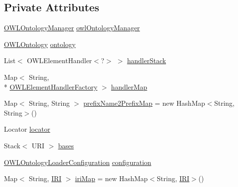 \subsection*{Private Attributes}
\begin{DoxyCompactItemize}
\item 
\hyperlink{interfaceorg_1_1semanticweb_1_1owlapi_1_1model_1_1_o_w_l_ontology_manager}{O\-W\-L\-Ontology\-Manager} \hyperlink{classorg_1_1coode_1_1owlapi_1_1owlxmlparser_1_1_o_w_l_x_m_l_parser_handler_a51c72f046db052e3704e4049b47f9c14}{owl\-Ontology\-Manager}
\item 
\hyperlink{interfaceorg_1_1semanticweb_1_1owlapi_1_1model_1_1_o_w_l_ontology}{O\-W\-L\-Ontology} \hyperlink{classorg_1_1coode_1_1owlapi_1_1owlxmlparser_1_1_o_w_l_x_m_l_parser_handler_a6d5ccb6789681f41e359aa9ac02babde}{ontology}
\item 
List$<$ O\-W\-L\-Element\-Handler$<$?$>$ $>$ \hyperlink{classorg_1_1coode_1_1owlapi_1_1owlxmlparser_1_1_o_w_l_x_m_l_parser_handler_a9c14591dd78f738abd2b47f7ebcf199d}{handler\-Stack}
\item 
Map$<$ String, \\*
\hyperlink{interfaceorg_1_1coode_1_1owlapi_1_1owlxmlparser_1_1_o_w_l_element_handler_factory}{O\-W\-L\-Element\-Handler\-Factory} $>$ \hyperlink{classorg_1_1coode_1_1owlapi_1_1owlxmlparser_1_1_o_w_l_x_m_l_parser_handler_a55c04cbf4b72c3dff117fabb010720a8}{handler\-Map}
\item 
Map$<$ String, String $>$ \hyperlink{classorg_1_1coode_1_1owlapi_1_1owlxmlparser_1_1_o_w_l_x_m_l_parser_handler_a3c632c754655fdcf3a3321244805d47e}{prefix\-Name2\-Prefix\-Map} = new Hash\-Map$<$String, String$>$()
\item 
Locator \hyperlink{classorg_1_1coode_1_1owlapi_1_1owlxmlparser_1_1_o_w_l_x_m_l_parser_handler_aba5b14a8a3f5be6534e0f65b2e680574}{locator}
\item 
Stack$<$ U\-R\-I $>$ \hyperlink{classorg_1_1coode_1_1owlapi_1_1owlxmlparser_1_1_o_w_l_x_m_l_parser_handler_a90db7d12c0d5cfe114dbd76147cc0f0e}{bases}
\item 
\hyperlink{classorg_1_1semanticweb_1_1owlapi_1_1model_1_1_o_w_l_ontology_loader_configuration}{O\-W\-L\-Ontology\-Loader\-Configuration} \hyperlink{classorg_1_1coode_1_1owlapi_1_1owlxmlparser_1_1_o_w_l_x_m_l_parser_handler_a1bcc0a7d0e8c701ef8b9cc56afe0f12c}{configuration}
\item 
Map$<$ String, \hyperlink{classorg_1_1semanticweb_1_1owlapi_1_1model_1_1_i_r_i}{I\-R\-I} $>$ \hyperlink{classorg_1_1coode_1_1owlapi_1_1owlxmlparser_1_1_o_w_l_x_m_l_parser_handler_ad14daaba62dd59bdbee7b6a0a92aeb1a}{iri\-Map} = new Hash\-Map$<$String, \hyperlink{classorg_1_1semanticweb_1_1owlapi_1_1model_1_1_i_r_i}{I\-R\-I}$>$()
\end{DoxyCompactItemize}


